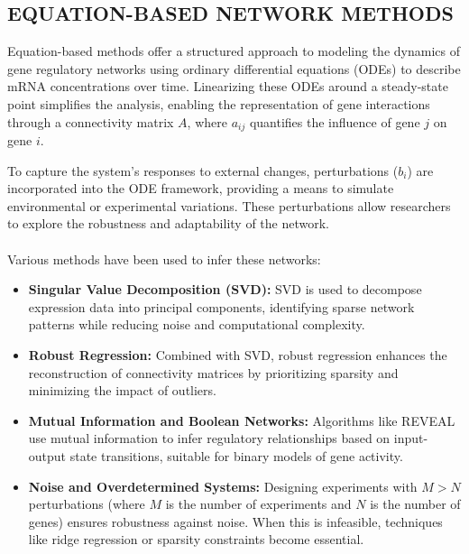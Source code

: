\subsection{EQUATION-BASED NETWORK METHODS}\label{subsec:equation-based-network-methods}
Equation-based methods offer a structured approach to modeling the dynamics of gene regulatory networks using ordinary differential equations (ODEs) to describe mRNA concentrations over time.
Linearizing these ODEs around a steady-state point simplifies the analysis, enabling the representation of gene interactions through a connectivity matrix \(A\), where \(a_{ij}\) quantifies the influence of gene \(j\) on gene \(i\)\cite{deng_molecular_2012}.


\noindent To capture the system's responses to external changes, perturbations (\(b_i\)) are incorporated into the ODE framework, providing a means to simulate environmental or experimental variations\cite{yeung_reverse_2002}.
These perturbations allow researchers to explore the robustness and adaptability of the network.
\\\\
\noindent Various methods have been used to infer these networks:

\begin{itemize}

    \item \textbf{Singular Value Decomposition (SVD):} SVD is used to decompose expression data into principal components, identifying sparse network patterns while reducing noise and computational complexity\cite{yeung_reverse_2002}.

    \item \textbf{Robust Regression:} Combined with SVD, robust regression enhances the reconstruction of connectivity matrices by prioritizing sparsity and minimizing the impact of outliers\cite{yeung_reverse_2002}.

    \item \textbf{Mutual Information and Boolean Networks:} Algorithms like REVEAL use mutual information to infer regulatory relationships based on input-output state transitions, suitable for binary models of gene activity\cite{akutsu_identification_1998}.

    \item \textbf{Noise and Overdetermined Systems:} Designing experiments with \(M > N\) perturbations (where \(M\) is the number of experiments and \(N\) is the number of genes) ensures robustness against noise.
    When this is infeasible, techniques like ridge regression or sparsity constraints become essential\cite{yeung_reverse_2002}.

\end{itemize}



